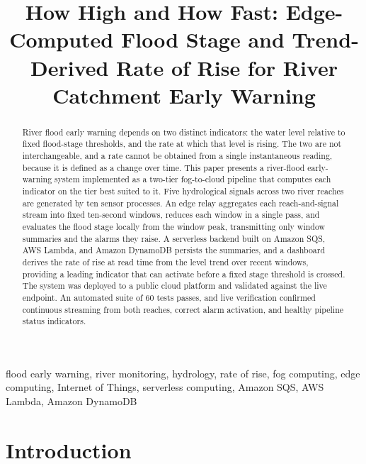 \documentclass[conference]{IEEEtran}
\begin{document}
\title{How High and How Fast: Edge-Computed Flood Stage and Trend-Derived Rate of Rise for River Catchment Early Warning}

\author{
}

\maketitle

\begin{abstract}
River flood early warning depends on two distinct indicators: the water level relative to fixed flood-stage thresholds, and the rate at which that level is rising. The two are not interchangeable, and a rate cannot be obtained from a single instantaneous reading, because it is defined as a change over time. This paper presents a river-flood early-warning system implemented as a two-tier fog-to-cloud pipeline that computes each indicator on the tier best suited to it. Five hydrological signals across two river reaches are generated by ten sensor processes. An edge relay aggregates each reach-and-signal stream into fixed ten-second windows, reduces each window in a single pass, and evaluates the flood stage locally from the window peak, transmitting only window summaries and the alarms they raise. A serverless backend built on Amazon SQS, AWS Lambda, and Amazon DynamoDB persists the summaries, and a dashboard derives the rate of rise at read time from the level trend over recent windows, providing a leading indicator that can activate before a fixed stage threshold is crossed. The system was deployed to a public cloud platform and validated against the live endpoint. An automated suite of 60 tests passes, and live verification confirmed continuous streaming from both reaches, correct alarm activation, and healthy pipeline status indicators.
\end{abstract}

\begin{IEEEkeywords}
flood early warning, river monitoring, hydrology, rate of rise, fog computing, edge computing, Internet of Things, serverless computing, Amazon SQS, AWS Lambda, Amazon DynamoDB
\end{IEEEkeywords}

\section{Introduction}
\end{document}
